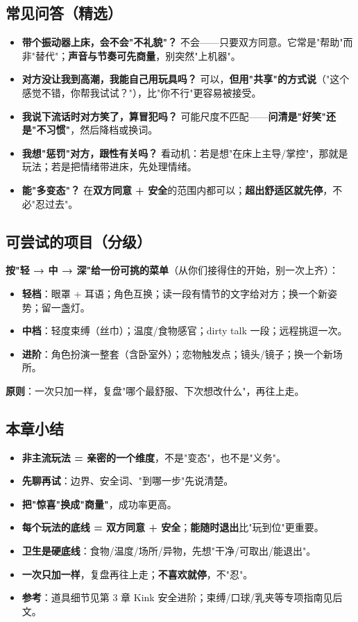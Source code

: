 \documentclass[12pt,UTF8,openany]{ctexbook}
\begin{document}
\subsection*{常见问答（精选）}
\begin{itemize}[leftmargin=2em,itemsep=0.5em]
  \item \textbf{带个振动器上床，会不会"不礼貌"？} 不会——只要双方同意。它常是"帮助"而非"替代"；\textbf{声音与节奏可先商量}，别突然"上机器"。
  \item \textbf{对方没让我到高潮，我能自己用玩具吗？} 可以，\textbf{但用"共享"的方式说}（"这个感觉不错，你帮我试试？"），比"你不行"更容易被接受。
  \item \textbf{我说下流话时对方笑了，算冒犯吗？} 可能尺度不匹配——\textbf{问清是"好笑"还是"不习惯"}，然后降档或换词。
  \item \textbf{我想"惩罚"对方，跟性有关吗？} 看动机：若是想"在床上主导/掌控"，那就是玩法；若是把情绪带进床，先处理情绪。
  \item \textbf{能"多变态"？} 在\textbf{双方同意 + 安全}的范围内都可以；\textbf{超出舒适区就先停}，不必"忍过去"。
\end{itemize}
\subsection*{可尝试的项目（分级）}
\textbf{按"轻 → 中 → 深"给一份可挑的菜单}（从你们接得住的开始，别一次上齐）：
\begin{itemize}[leftmargin=2em,itemsep=0.3em]
  \item \textbf{轻档}：眼罩 + 耳语；角色互换；读一段有情节的文字给对方；换一个新姿势；留一盏灯。
  \item \textbf{中档}：轻度束缚（丝巾）；温度/食物感官；dirty talk 一段；远程挑逗一次。
  \item \textbf{进阶}：角色扮演一整套（含卧室外）；恋物触发点；镜头/镜子；换一个新场所。
\end{itemize}
\textbf{原则}：一次只加一样，复盘"哪个最舒服、下次想改什么"，再往上走。
\subsection*{本章小结}
\begin{itemize}[leftmargin=2em,itemsep=0.3em]
  \item \textbf{非主流玩法 = 亲密的一个维度}，不是"变态"，也不是"义务"。
  \item \textbf{先聊再试}：边界、安全词、"到哪一步"先说清楚。
  \item \textbf{把"惊喜"换成"商量"}，成功率更高。
  \item \textbf{每个玩法的底线 = 双方同意 + 安全}；\textbf{能随时退出}比"玩到位"更重要。
  \item \textbf{卫生是硬底线}：食物/温度/场所/异物，先想"干净/可取出/能退出"。
  \item \textbf{一次只加一样}，复盘再往上走；\textbf{不喜欢就停}，不"忍"。
  \item \textbf{参考}：道具细节见第 3 章 Kink 安全进阶；束缚/口球/乳夹等专项指南见后文。
\end{itemize}
\end{document}
